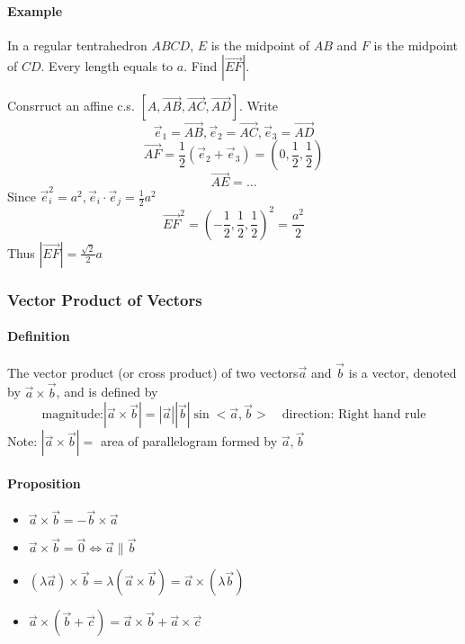 \documentclass[11pt]{book}
\begin{document}
\paragraph{Example} In a regular tentrahedron $ABCD$, $E$ is the midpoint of $AB$ and $F$ is the midpoint of $CD$.
Every length equals to $a$. Find $|\overrightarrow{EF}|$.

Consrruct an affine c.s. $[A,\overrightarrow{AB},\overrightarrow{AC},\overrightarrow{AD}]$.
Write 
$$
\vec e_1 = \overrightarrow{AB}, \vec e_2 = \overrightarrow{AC},\vec e_3= \overrightarrow{AD}
$$
$$
\overrightarrow{AF} = \frac{1}{2}(\vec e_2+ \vec e_3)= (0,\frac{1}{2},\frac{1}{2})
$$
$$
\overrightarrow{AE}= ...
$$
Since $\vec e_i^2= a^2, \vec e_i \cdot \vec e_j = \frac{1}{2} a^2$
$$
\overrightarrow{EF}^2= (-\frac{1}{2},\frac{1}{2},\frac{1}{2})^2 = \frac{a^2}{2}
$$
Thus $|\overrightarrow{EF}|= \frac{\sqrt{2}}{2}a$

\subsubsection{Vector Product of Vectors}

\paragraph{Definition}
The vector product (or cross product) of two vectors$\vec a$ and $ \vec b$ is a vector, denoted by $\vec a \times \vec b$,
and is defined by 
$$
\text{magnitude:} |\vec a \times \vec b | = |\vec a| |\vec b| \sin <\vec a,\vec b>  \quad
\text{direction: Right hand rule}
$$
Note: $|\vec a \times \vec b| = $ area of parallelogram formed by $\vec a, \vec b$ 

\paragraph{Proposition}

\begin{itemize}
  \item $\vec a \times \vec b = - \vec b \times \vec a $
  \item $\vec a \times \vec b = \vec 0 \iff \vec a \parallel \vec b$
  \item $(\lambda \vec a)\times \vec b  = \lambda (\vec a \times \vec b) = \vec a \times (\lambda \vec b)$
  \item $\vec a \times (\vec b + \vec c) = \vec a \times \vec b+ \vec a \times \vec c$
\end{itemize}
\end{document}
